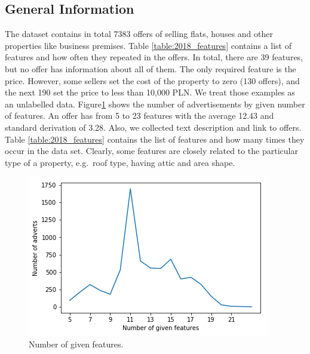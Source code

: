 \documentclass[11pt,a4paper]{article}
\begin{document}
\subsection{General Information}
The dataset contains in total 7383 offers of selling flats, houses and other properties like business premises. Table \ref{table:2018_features} contains a list of features and how often they repeated in the offers. In total, there are 39 features, but no offer has information about all of them. The only required feature is the price. However, some sellers set the cost of the property to zero (130 offers), and the next 190 set the price to less than 10,000 PLN. We treat those examples as an unlabelled data. Figure\ref{fig:features} shows the number of advertisements by given number of features. An offer has from 5 to 23 features with the average 12.43 and standard derivation of 3.28. Also, we collected text description and link to offers. Table  \ref{table:2018_features} contains the list of features and how many times they occur in the data set. Clearly, some features are closely related to the particular type of a property, e.g.\ roof type, having attic and area shape.
\begin{figure}[htpb]
  \centering
  \includegraphics[width=0.8\linewidth]{./plots/features.png}
  \caption{Number of given features.}\label{fig:features}
\end{figure}
\end{document}
